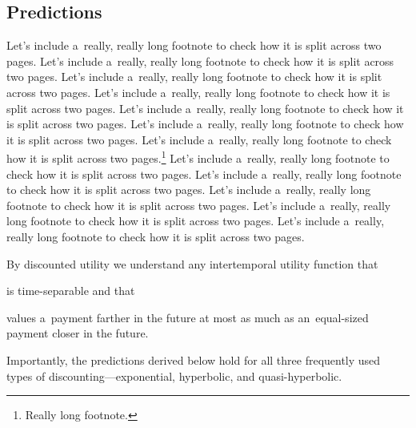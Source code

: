 


\subsection{Predictions}
\label{sec:Predictions}

\blindtext

Let's include a~really, really long footnote to check how it is split across two pages. Let's include a~really, really long footnote to check how it is split across two pages. Let's include a~really, really long footnote to check how it is split across two pages. Let's include a~really, really long footnote to check how it is split across two pages. Let's include a~really, really long footnote to check how it is split across two pages. Let's include a~really, really long footnote to check how it is split across two pages. Let's include a~really, really long footnote to check how it is split across two pages.\footnote{Really long footnote.\blindmathfalse\blindtext[1]\par\blindtext[2]\par\blindtext[4]\blindmathtrue} Let's include a~really, really long footnote to check how it is split across two pages. Let's include a~really, really long footnote to check how it is split across two pages. Let's include a~really, really long footnote to check how it is split across two pages. Let's include a~really, really long footnote to check how it is split across two pages. Let's include a~really, really long footnote to check how it is split across two pages.

By discounted utility we understand any intertemporal utility function that
\begin{enumerate*}
\item is time-separable and that
\item values a~payment farther in the future at most as much as an~equal-sized payment closer in the future.
\end{enumerate*}
Importantly, the predictions derived below hold for all three frequently used types of discounting---exponential, hyperbolic, and quasi-hyperbolic.

